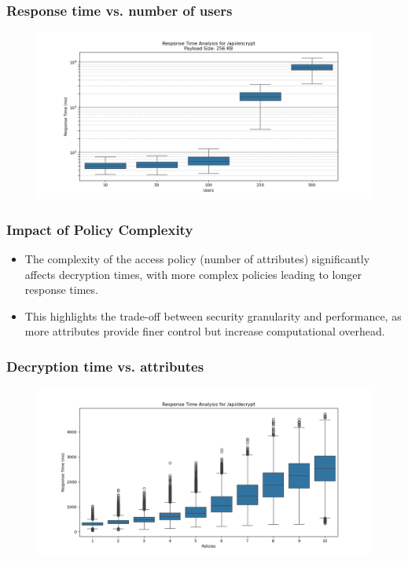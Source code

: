 \documentclass{beamer}
\begin{document}
\begin{frame}
    \frametitle{Response time vs. number of users}
    \begin{figure}
        \includegraphics[width=\textwidth,height=0.7\textheight,keepaspectratio]{images/phase3/response_time_api_encrypt_256KB.png}
    \end{figure}
\end{frame}

\begin{frame}
    \frametitle{Impact of Policy Complexity}
    \begin{itemize}
        \item The complexity of the access policy (number of attributes) significantly affects decryption times, with more complex policies leading to longer response times.
        \item This highlights the trade-off between security granularity and performance, as more attributes provide finer control but increase computational overhead.
    \end{itemize}
\end{frame}

\begin{frame}
    \frametitle{Decryption time vs. attributes}
    \begin{figure}
        \includegraphics[width=\textwidth,height=0.7\textheight,keepaspectratio]{images/phase4/response_time_api_decrypt.png}
    \end{figure}
\end{frame}
\end{document}
